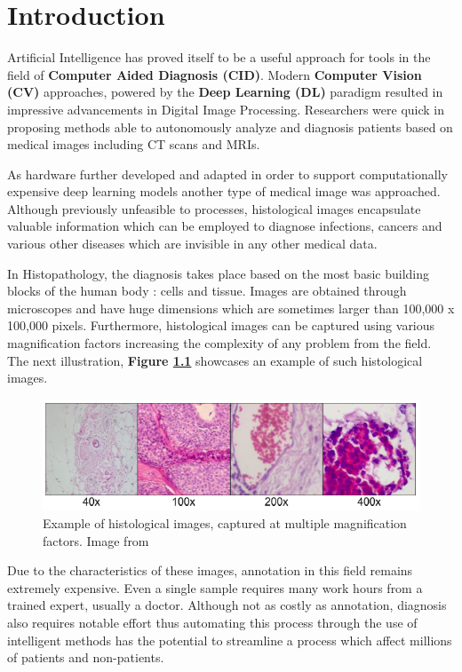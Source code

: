  \chapter{Introduction}
\label{chapter:introduction}

Artificial Intelligence has proved itself to be a useful approach for tools in the field of \textbf{Computer Aided Diagnosis (CID)}. Modern \textbf{Computer Vision (CV)} approaches, powered by the \textbf{Deep Learning (DL)} \cite{lecun2015deep} paradigm resulted in impressive advancements in Digital Image Processing. Researchers were quick in proposing methods able to autonomously analyze and diagnosis patients based on medical images including CT scans and MRIs.

As hardware further developed and adapted in order to support computationally expensive deep learning models another type of medical image was approached. Although previously unfeasible to processes, histological images encapsulate valuable information which can be employed to diagnose infections, cancers and various other diseases which are invisible in any other medical data. 

In Histopathology, the diagnosis takes place based on the most basic building blocks of the human body : cells and tissue. Images are obtained through microscopes and have huge dimensions which are sometimes larger than 100,000 x 100,000 pixels. Furthermore, histological images can be captured using various magnification factors increasing the complexity of any problem from the field. The next illustration, \textbf{Figure \ref{histo_img}} showcases an example of such histological images.

\begin{figure}[htb]
    \centering
	\centerline{\includegraphics[scale=1]{figures/breast_histoimg_multiple_scales.png}}
	\caption{Example of histological images, captured at multiple magnification factors. Image from \cite{bayramoglu2016deep}}
	\label{histo_img}
\end{figure}

Due to the characteristics of these images, annotation in this field remains extremely expensive. Even a single sample requires many work hours from a trained expert, usually a doctor. Although not as costly as annotation, diagnosis also requires notable effort thus automating this process through the use of intelligent methods has the potential to streamline a process which affect millions of patients and non-patients. 

